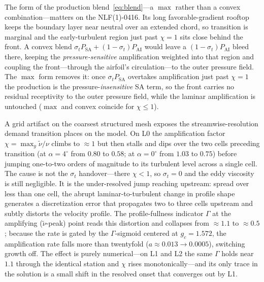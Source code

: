 \documentclass[journal]{new-aiaa}
\begin{document}
The form of the production blend~\eqref{eq:blend}---a $\max$ rather than a convex
combination---matters on the NLF(1)-0416. Its long favorable-gradient rooftop
keeps the boundary layer near neutral over an extended chord, so transition is
marginal and the early-turbulent region just past $\chi\!=\!1$ sits close behind
the front. A convex blend $\sigma_t P_\mathrm{SA}+(1-\sigma_t)P_\mathrm{AI}$
would leave a $(1-\sigma_t)P_\mathrm{AI}$ bleed there, keeping the
\emph{pressure-sensitive} amplification weighted into that region and coupling the
front---through the airfoil's circulation---to the outer pressure field. The
$\max$ form removes it: once $\sigma_t P_\mathrm{SA}$ overtakes amplification just
past $\chi\!=\!1$ the production is the pressure-\emph{insensitive} SA term, so the
front carries no residual receptivity to the outer pressure field, while the
laminar amplification is untouched ($\max$ and convex coincide for
$\chi\!\le\!1$).

A grid artifact on the coarsest structured mesh exposes the streamwise-resolution
demand transition places on the model. On L0 the
amplification factor $\chi\!=\!\max_y\tilde\nu/\nu$ climbs to $\approx\!1$ but then
stalls and dips over the two cells preceding transition (at $\alpha\!=\!4^\circ$
from $0.80$ to $0.58$; at $\alpha\!=\!0^\circ$ from $1.03$ to $0.75$) before jumping
one-to-two orders of magnitude to its turbulent level across a single cell. The
cause is not the $\sigma_t$ handover---there $\chi\!<\!1$, so $\sigma_t\!=\!0$ and
the eddy viscosity is still negligible. It is the under-resolved jump reaching
upstream: spread over less than one cell, the abrupt laminar-to-turbulent change in
profile shape generates a discretization error that propagates two to three cells
upstream and subtly distorts the velocity profile. The profile-fullness indicator
$\Gamma$ at the amplifying ($\tilde\nu$-peak) point reads this distortion and
collapses from $\approx\!1.1$ to $\approx\!0.5$; because the rate is gated by the
$\Gamma$-sigmoid centered at $g_c\!=\!1.572$, the amplification rate falls more than
twentyfold ($a\!\approx\!0.013\!\to\!0.0005$), switching growth off. The effect is
purely numerical---on L1 and L2 the same $\Gamma$ holds near $1.1$ through the
identical station and $\chi$ rises monotonically---and its only trace in the
solution is a small shift in the resolved onset that converges out by L1.
\end{document}
